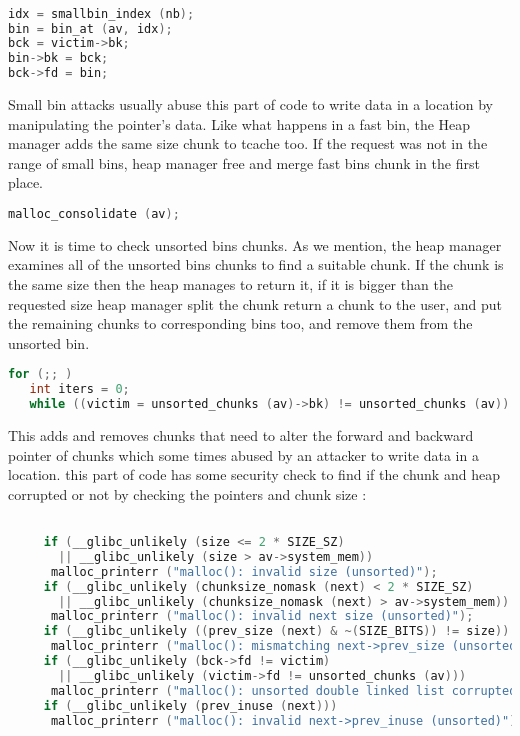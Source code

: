 \documentclass{masterthesis}
\begin{document}
\begin{lstlisting}[language=c,frame=tlrb]

idx = smallbin_index (nb);
bin = bin_at (av, idx);
bck = victim->bk;
bin->bk = bck;
bck->fd = bin;
\end{lstlisting}

Small bin attacks usually abuse this part of code to write data in a location by manipulating the pointer's data. Like what happens in a fast bin, the Heap manager adds the same size chunk to tcache too. If the request was not in the range of small bins, heap manager free and merge fast bins chunk in the first place.
\begin{lstlisting}[language=c,frame=tlrb]
malloc_consolidate (av);
\end{lstlisting}

Now it is time to check unsorted bins chunks. As we mention, the heap manager examines all of the unsorted bins chunks to find a suitable chunk. If the chunk is the same size then the heap manages to return it, if it is bigger than the requested size heap manager split the chunk return a chunk to the user, and put the remaining chunks to corresponding bins too, and remove them from the unsorted bin.
\begin{lstlisting}[language=c]
for (;; )  
   int iters = 0;
   while ((victim = unsorted_chunks (av)->bk) != unsorted_chunks (av))
\end{lstlisting}
This adds and removes chunks that need to alter the forward and backward pointer of chunks which some times abused by an attacker to write data in a location. this part of code has some security check to find if the chunk and heap corrupted or not by checking the pointers and chunk size :
\begin{lstlisting}[language=c,frame=tlrb]

     if (__glibc_unlikely (size <= 2 * SIZE_SZ)
       || __glibc_unlikely (size > av->system_mem))
      malloc_printerr ("malloc(): invalid size (unsorted)");
     if (__glibc_unlikely (chunksize_nomask (next) < 2 * SIZE_SZ)
       || __glibc_unlikely (chunksize_nomask (next) > av->system_mem))
      malloc_printerr ("malloc(): invalid next size (unsorted)");
     if (__glibc_unlikely ((prev_size (next) & ~(SIZE_BITS)) != size))
      malloc_printerr ("malloc(): mismatching next->prev_size (unsorted)");
     if (__glibc_unlikely (bck->fd != victim)
       || __glibc_unlikely (victim->fd != unsorted_chunks (av)))
      malloc_printerr ("malloc(): unsorted double linked list corrupted");
     if (__glibc_unlikely (prev_inuse (next)))
      malloc_printerr ("malloc(): invalid next->prev_inuse (unsorted)");
\end{lstlisting}
\end{document}
